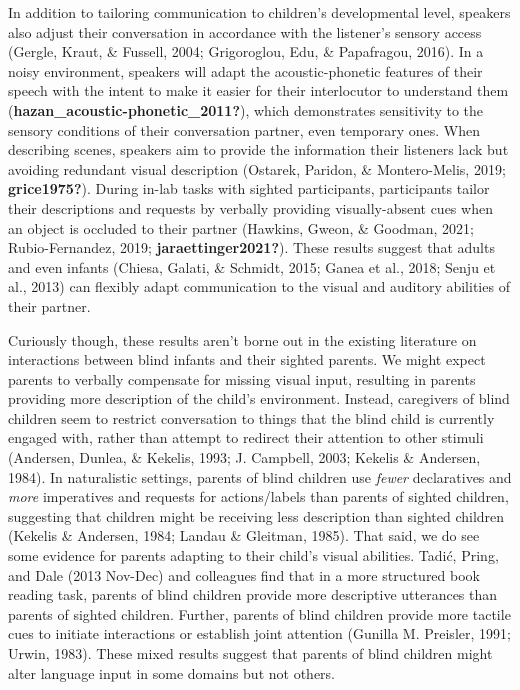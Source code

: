 \documentclass[
  man]{apa6}
\begin{document}
In addition to tailoring communication to children's developmental level, speakers also adjust their conversation in accordance with the listener's sensory access (Gergle, Kraut, \& Fussell, 2004; Grigoroglou, Edu, \& Papafragou, 2016). In a noisy environment, speakers will adapt the acoustic-phonetic features of their speech with the intent to make it easier for their interlocutor to understand them (\textbf{hazan\_acoustic-phonetic\_2011?}), which demonstrates sensitivity to the sensory conditions of their conversation partner, even temporary ones. When describing scenes, speakers aim to provide the information their listeners lack but avoiding redundant visual description (Ostarek, Paridon, \& Montero-Melis, 2019; \textbf{grice1975?}). During in-lab tasks with sighted participants, participants tailor their descriptions and requests by verbally providing visually-absent cues when an object is occluded to their partner (Hawkins, Gweon, \& Goodman, 2021; Rubio-Fernandez, 2019; \textbf{jaraettinger2021?}). These results suggest that adults and even infants (Chiesa, Galati, \& Schmidt, 2015; Ganea et al., 2018; Senju et al., 2013) can flexibly adapt communication to the visual and auditory abilities of their partner.

Curiously though, these results aren't borne out in the existing literature on interactions between blind infants and their sighted parents. We might expect parents to verbally compensate for missing visual input, resulting in parents providing more description of the child's environment. Instead, caregivers of blind children seem to restrict conversation to things that the blind child is currently engaged with, rather than attempt to redirect their attention to other stimuli (Andersen, Dunlea, \& Kekelis, 1993; J. Campbell, 2003; Kekelis \& Andersen, 1984). In naturalistic settings, parents of blind children use \emph{fewer} declaratives and \emph{more} imperatives and requests for actions/labels than parents of sighted children, suggesting that children might be receiving less description than sighted children (Kekelis \& Andersen, 1984; Landau \& Gleitman, 1985). That said, we do see some evidence for parents adapting to their child's visual abilities. Tadić, Pring, and Dale (2013 Nov-Dec) and colleagues find that in a more structured book reading task, parents of blind children provide more descriptive utterances than parents of sighted children. Further, parents of blind children provide more tactile cues to initiate interactions or establish joint attention (Gunilla M. Preisler, 1991; Urwin, 1983). These mixed results suggest that parents of blind children might alter language input in some domains but not others.
\end{document}

